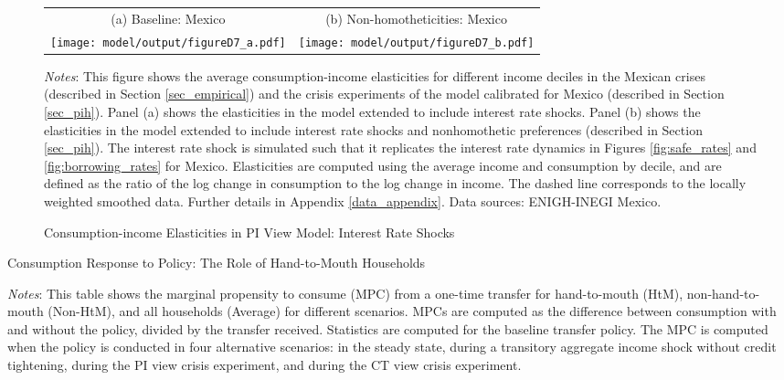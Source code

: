 \documentclass[12pt]{article}
\begin{document}
\begin{spacing}{1.5}
\begin{figure}[H]
\end{figure}
\begin{figure}[H]
\caption{Consumption-income Elasticities in PI View Model: Interest Rate Shocks}
\label{fig:cyelast_extensions_mex}
\begin{tabular}{cc}
(a) Baseline: Mexico & (b) Non-homotheticities: Mexico\\
\texttt{[image: model/output/figureD7\_a.pdf]} &
\texttt{[image: model/output/figureD7\_b.pdf]} 
\end{tabular}
\raggedright{}\textit{\footnotesize{}Notes}{: \footnotesize{
This figure shows the average consumption-income elasticities for different income deciles in the Mexican crises (described in Section \ref{sec_empirical}) and the crisis experiments of the model calibrated for Mexico (described in Section \ref{sec_pih}). Panel (a) shows the elasticities in the model extended to include interest rate shocks.  Panel (b) shows the elasticities in the model extended to include interest rate shocks and nonhomothetic preferences (described in Section \ref{sec_pih}).
The interest rate shock is simulated such that it replicates the interest rate dynamics in Figures \ref{fig:safe_rates} and \ref{fig:borrowing_rates} for Mexico. Elasticities are computed using the average income and consumption by decile, and are defined as the ratio of the log change in consumption to the log change in income. The dashed line corresponds to the locally weighted smoothed data. Further details in Appendix \ref{data_appendix}. Data sources: ENIGH-INEGI Mexico.}}{\footnotesize\par}
\end{figure}

\begin{table}[H]
\begin{centering}
\caption{{\color{black}Consumption Response to Policy: The Role of Hand-to-Mouth Households}
{\label{tab_policy_htm}}}

\par\end{centering}
\medskip{}
\raggedright{}\textit{\footnotesize{}Notes}{\footnotesize{}: \color{black}This table shows the marginal propensity to consume (MPC) from a one-time transfer for hand-to-mouth (HtM), non-hand-to-mouth (Non-HtM), and all households (Average) for different scenarios.  MPCs are computed as the difference between consumption with and without the policy,  divided by the transfer received.  Statistics are computed for the baseline transfer policy.  The MPC is computed when the policy is conducted in four alternative scenarios: in the steady state,  during a transitory aggregate income shock without credit tightening,  during the PI view crisis experiment, and during the CT view crisis experiment.  }{\footnotesize\par}
\end{table}


\end{spacing}
\end{document}
